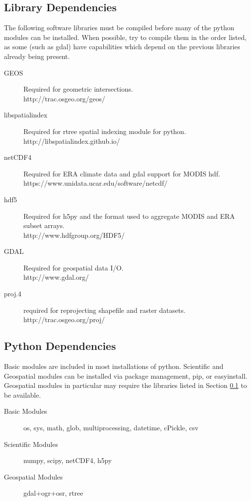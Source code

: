 \documentclass[twoside,a4paper]{refart}
\begin{document}
\subsection{Library Dependencies}\label{libraries}
The following software libraries must be compiled before many 
of the python modules can be installed.  
When possible, try to compile them in the order listed, as some 
(such as gdal) have capabilities which depend on the previous 
libraries already being present.
\begin{description}

\item[GEOS]
        Required for geometric intersections.\\
        http://trac.osgeo.org/geos/

\item[libspatialindex]
        Required for rtree spatial indexing module for python.\\
        http://libspatialindex.github.io/

\item[netCDF4]
        Required for ERA climate data and gdal support for MODIS hdf.\\
        https://www.unidata.ucar.edu/software/netcdf/
        
\item[hdf5]
       Required for h5py and the format used 
       to aggregate MODIS and ERA subset arrays.\\
       http://www.hdfgroup.org/HDF5/
       
\item[GDAL]
        Required for geospatial data I/O.\\
        http://www.gdal.org/

\item[proj.4]
       required for reprojecting shapefile and raster datasets.\\
       http://trac.osgeo.org/proj/

\end{description}


\subsection{Python Dependencies}\label{python-modules}
Basic modules are included in most installations of python.  Scientific and Geospatial modules can be installed via package management, pip, or easyinstall. Geospatial modules in particular may require the libraries listed in Section \ref{libraries} to be available.
\begin{description}
\item[Basic Modules]
        os, sys, math, glob, multiprocessing, datetime, cPickle, csv

\item[Scientific Modules]
        numpy, scipy, netCDF4, h5py

\item[Geospatial Modules]
        gdal+ogr+osr, rtree
     
\end{description}
\end{document}
